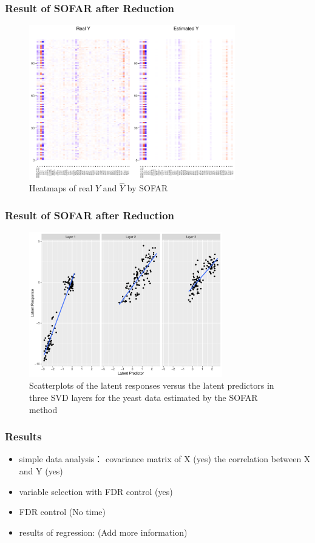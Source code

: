 \begin{frame}
    \frametitle{Result of SOFAR after Reduction}
    \begin{figure}[h]
        \centering
        \includegraphics[width=0.8\textwidth]{./figs/heatmap2.pdf}
        \caption{Heatmaps of real $Y$ and $\hat{Y}$ by SOFAR}
    \end{figure}
\end{frame}

\begin{frame}
    \frametitle{Result of SOFAR after Reduction}
    \begin{figure}[h]
        \centering
        \includegraphics[width=0.75\textwidth]{./figs/letent2.pdf}
        \caption{Scatterplots of the latent responses versus the latent predictors in three SVD layers for the yeast data estimated by the SOFAR method}
    \end{figure}
\end{frame}


\begin{frame} \frametitle{Results}

    \begin{itemize}
        \item simple data analysis：
        covariance matrix of X (yes)
        the correlation between X and Y (yes)

        \item variable selection with FDR control (yes)
        
        \item FDR control (No time)
        
        \item results of regression: (Add more information)
    \end{itemize}
\end{frame}

